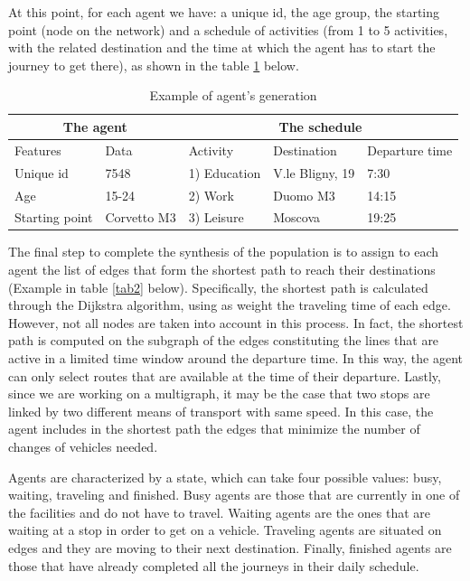 At this point, for each agent we have: a unique id, the age group, the starting point (node on the network) and a schedule of activities (from 1 to 5 activities, with the related destination and the time at which the agent has to start the journey to get there), as shown in the table \ref{tab1} below. 

\begin{table}[h]
\centering
\caption{Example of agent's generation}\label{tab1}%
\begin{tabular}{ll|lll}
\multicolumn{2}{c|}{The agent} & \multicolumn{3}{c}{The schedule} \\ 
\toprule
Features      & Data      & Activity & Destination & Departure time \\ 
\midrule
Unique id & 7548 & 1) Education & V.le Bligny, 19 & 7:30\\
Age & 15-24  &  2) Work	& Duomo M3 & 14:15\\
Starting point & Corvetto M3 & 3) Leisure & Moscova & 19:25\\
\bottomrule
\end{tabular}
\end{table}

The final step to complete the synthesis of the population is to assign to each agent the list of edges that form the shortest path to reach their destinations (Example in table \ref{tab2} below). Specifically, the shortest path is calculated through the Dijkstra algorithm, using as weight the traveling time of each edge. However, not all nodes are taken into account in this process. In fact, the shortest path is computed on the subgraph of the edges constituting the lines that are active in a limited time window around the departure time. In this way, the agent can only select routes that are available at the time of their departure. Lastly, since we are working on a multigraph, it may be the case that two stops are linked by two different means of transport with same speed. In this case, the agent includes in the shortest path the edges that minimize the number of changes of vehicles needed.


Agents are characterized by a state, which can take four possible values: busy, waiting, traveling and finished. Busy agents are those that are currently in one of the facilities and do not have to travel. Waiting agents are the ones that are waiting at a stop in order to get on a vehicle. Traveling agents are situated on edges and they are moving to their next destination. Finally, finished agents are those that have already completed all the journeys in their daily schedule.

